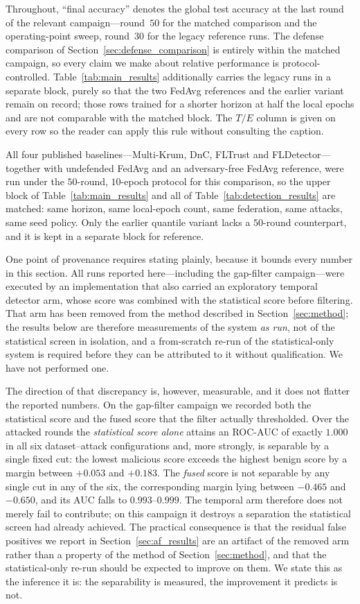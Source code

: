 \documentclass[journal]{IEEEtran}
\begin{document}
Throughout, ``final accuracy'' denotes the global test accuracy at the last round of the relevant campaign---round~$50$ for the matched comparison and the operating-point sweep, round~$30$ for the legacy reference runs. The defense comparison of Section~\ref{sec:defense_comparison} is entirely within the matched campaign, so every claim we make about relative performance is protocol-controlled. Table~\ref{tab:main_results} additionally carries the legacy runs in a separate block, purely so that the two FedAvg references and the earlier variant remain on record; those rows trained for a shorter horizon at half the local epochs and are not comparable with the matched block. The $T/E$ column is given on every row so the reader can apply this rule without consulting the caption.

All four published baselines---Multi-Krum, DnC, FLTrust and FLDetector---together with undefended FedAvg and an adversary-free FedAvg reference, were run under the $50$-round, $10$-epoch protocol for this comparison, so the upper block of Table~\ref{tab:main_results} and all of Table~\ref{tab:detection_results} are matched: same horizon, same local-epoch count, same federation, same attacks, same seed policy. Only the earlier quantile variant lacks a $50$-round counterpart, and it is kept in a separate block for reference.

One point of provenance requires stating plainly, because it bounds every number in this section. All runs reported here---including the gap-filter campaign---were executed by an implementation that also carried an exploratory temporal detector arm, whose score was combined with the statistical score before filtering. That arm has been removed from the method described in Section~\ref{sec:method}; the results below are therefore measurements of the system \emph{as run}, not of the statistical screen in isolation, and a from-scratch re-run of the statistical-only system is required before they can be attributed to it without qualification. We have not performed one.

The direction of that discrepancy is, however, measurable, and it does not flatter the reported numbers. On the gap-filter campaign we recorded both the statistical score and the fused score that the filter actually thresholded. Over the attacked rounds the \emph{statistical score alone} attains an ROC-AUC of exactly $1.000$ in all six dataset--attack configurations and, more strongly, is separable by a single fixed cut: the lowest malicious score exceeds the highest benign score by a margin between $+0.053$ and $+0.183$. The \emph{fused} score is not separable by any single cut in any of the six, the corresponding margin lying between $-0.465$ and $-0.650$, and its AUC falls to $0.993$--$0.999$. The temporal arm therefore does not merely fail to contribute; on this campaign it destroys a separation the statistical screen had already achieved. The practical consequence is that the residual false positives we report in Section~\ref{sec:af_results} are an artifact of the removed arm rather than a property of the method of Section~\ref{sec:method}, and that the statistical-only re-run should be expected to improve on them. We state this as the inference it is: the separability is measured, the improvement it predicts is not.
\end{document}

